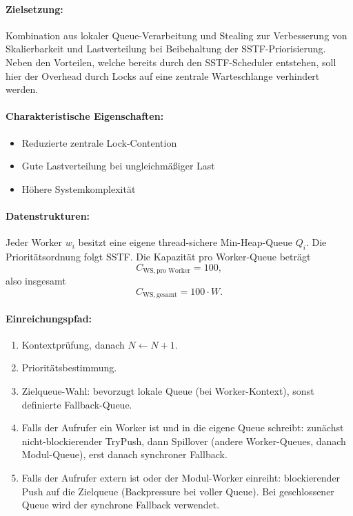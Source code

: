 \begin{sloppypar}
\paragraph{Zielsetzung:}
Kombination aus lokaler Queue-Verarbeitung und Stealing 
zur Verbesserung von Skalierbarkeit und Lastverteilung bei Beibehaltung der \acs{SSTF}-Priorisierung.
Neben den Vorteilen, welche bereits durch den \acs{SSTF}-Scheduler entstehen, 
soll hier der Overhead durch Locks auf eine zentrale Warteschlange verhindert werden.

\paragraph{Charakteristische Eigenschaften:}
\begin{itemize}
\item Reduzierte zentrale Lock-Contention
\item Gute Lastverteilung bei ungleichmäßiger Last
\item Höhere Systemkomplexität
\end{itemize}

\paragraph{Datenstrukturen:}
Jeder Worker $w_i$ besitzt eine eigene thread-sichere Min-Heap-Queue $Q_i$.
Die Prioritätsordnung folgt \acs{SSTF}.
Die Kapazität pro Worker-Queue beträgt
\[
C_{\mathrm{WS,pro\;Worker}}=100,
\]
also insgesamt
\[
C_{\mathrm{WS,gesamt}}=100\cdot W.
\]

\paragraph{Einreichungspfad:}
\begin{enumerate}
\item Kontextprüfung, danach $N \gets N+1$.
\item Prioritätsbestimmung.
\item Zielqueue-Wahl: bevorzugt lokale Queue (bei Worker-Kontext), sonst definierte Fallback-Queue.
\item Falls der Aufrufer ein Worker ist und in die eigene Queue schreibt:
zunächst nicht-blockierender TryPush, dann Spillover (andere Worker-Queues, danach Modul-Queue), erst danach synchroner Fallback.
\item Falls der Aufrufer extern ist oder der Modul-Worker einreiht:
blockierender Push auf die Zielqueue (Backpressure bei voller Queue).
Bei geschlossener Queue wird der synchrone Fallback verwendet.
\end{enumerate}


\end{sloppypar}
